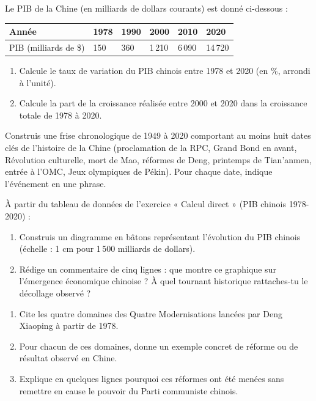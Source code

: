 \documentclass[11pt]{article}
\newcommand{\cle}[1]{{\popxbold\color{popdark}#1}}
\newcounter{popsec}
\newcounter{popsub}
\newcommand{\courssub}[1]{%
  \stepcounter{popsub}%
  \par\vspace{9pt}\noindent{\popxbold\fontsize{11.5}{13}\selectfont\color{popink}{\color{poporange}\thepopsec.\thepopsub}\hspace{6pt}#1}\par\nopagebreak\vspace{4pt}
}
\begin{document}
\begin{exercice}
Le PIB de la Chine (en milliards de dollars courants) est donné ci-dessous :
\begin{center}
\begin{tabularx}{\linewidth}{|l|X|X|X|X|X|}
\hline
\rowcolor{popblueL} Année & 1978 & 1990 & 2000 & 2010 & 2020 \\
\hline
PIB (milliards de \$) & 150 & 360 & 1\,210 & 6\,090 & 14\,720 \\
\hline
\end{tabularx}
\end{center}
\begin{enumerate}
\item Calcule le taux de variation du PIB chinois entre 1978 et 2020 (en \%, arrondi à l'unité).
\item Calcule la part de la croissance réalisée entre 2000 et 2020 dans la croissance totale de 1978 à 2020.
\end{enumerate}
\end{exercice}

\courssub{Je m'entraîne}

\begin{exercice}
Construis une frise chronologique de 1949 à 2020 comportant au moins huit dates clés de l'histoire de la Chine (proclamation de la RPC, Grand Bond en avant, Révolution culturelle, mort de Mao, réformes de Deng, printemps de Tian'anmen, entrée à l'OMC, Jeux olympiques de Pékin). Pour chaque date, indique l'événement en une phrase.
\end{exercice}

\begin{exercice}
À partir du tableau de données de l'exercice « Calcul direct » (PIB chinois 1978-2020) :
\begin{enumerate}
\item Construis un diagramme en bâtons représentant l'évolution du PIB chinois (échelle : 1 cm pour 1\,500 milliards de dollars).
\item Rédige un commentaire de cinq lignes : que montre ce graphique sur l'émergence économique chinoise ? À quel tournant historique rattaches-tu le décollage observé ?
\end{enumerate}
\end{exercice}

\begin{exercice}
\begin{enumerate}
\item Cite les quatre domaines des \cle{Quatre Modernisations} lancées par Deng Xiaoping à partir de 1978.
\item Pour chacun de ces domaines, donne un exemple concret de réforme ou de résultat observé en Chine.
\item Explique en quelques lignes pourquoi ces réformes ont été menées sans remettre en cause le pouvoir du Parti communiste chinois.
\end{enumerate}
\end{exercice}
\end{document}
